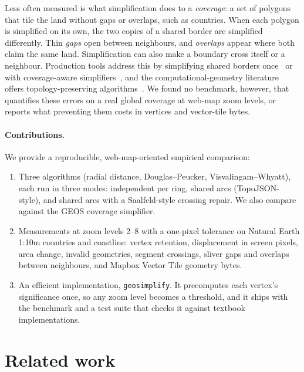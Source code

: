 \documentclass[11pt]{article}
\begin{document}
Less often measured is what simplification does to a \emph{coverage}: a set of
polygons that tile the land without gaps or overlaps, such as countries. When
each polygon is simplified on its own, the two copies of a shared border are
simplified differently. Thin \emph{gaps} open between neighbours, and
\emph{overlaps} appear where both claim the same land. Simplification can also
make a boundary cross itself or a neighbour. Production tools address this by
simplifying shared borders once~\citep{topojson,harrower2006,tippecanoe} or with
coverage-aware simplifiers~\citep{jtscoverage}, and the computational-geometry
literature offers topology-preserving algorithms~\citep{deberg1998,saalfeld1999,estkowski2001,corcoran2011}.
We found no benchmark, however, that quantifies these errors on a real global
coverage at web-map zoom levels, or reports what preventing them costs in
vertices and vector-tile bytes.

\paragraph{Contributions.}
We provide a reproducible, web-map-oriented empirical comparison:
\begin{enumerate}
\item Three algorithms (radial distance, Douglas--Peucker,
  Visvalingam--Whyatt), each run in three modes: independent per ring, shared
  arcs (TopoJSON-style), and shared arcs with a Saalfeld-style crossing repair.
  We also compare against the GEOS coverage simplifier.
\item Measurements at zoom levels 2--8 with a one-pixel tolerance on Natural
  Earth 1:10m countries and coastline: vertex retention, displacement in
  screen pixels, area change, invalid geometries, segment crossings, sliver
  gaps and overlaps between neighbours, and Mapbox Vector Tile geometry bytes.
\item An efficient implementation, \texttt{geosimplify}. It precomputes each
  vertex's significance once, so any zoom level becomes a threshold, and it
  ships with the benchmark and a test suite that checks it against textbook
  implementations.
\end{enumerate}

\section{Related work}
\end{document}
